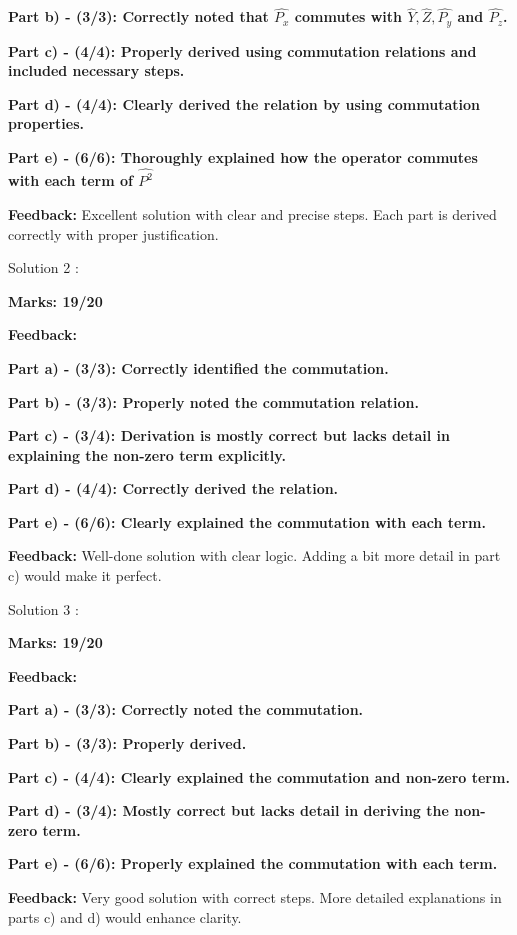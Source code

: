 \documentclass[a4paper,11pt]{article}
\begin{document}
\textbf{Part b) - (3/3): Correctly noted that $\hat{P_x}$ commutes with $\hat{Y},\hat{Z}, \hat{P_y}$ and $\hat{P_z}$.}

\textbf{Part c) - (4/4): Properly derived using commutation relations and included necessary steps.}

\textbf{Part d) - (4/4): Clearly derived the relation by using commutation properties.}

\textbf{Part e) - (6/6): Thoroughly explained how the operator commutes with each term of $\hat{P^2}$}


\textbf{Feedback:}
Excellent solution with clear and precise steps. Each part is derived correctly with proper justification.


Solution 2 :

\textbf{Marks: 19/20}

\textbf{Feedback:}

\textbf{Part a) - (3/3): Correctly identified the commutation.}

\textbf{Part b) -  (3/3): Properly noted the commutation relation.}

\textbf{Part c) - (3/4): Derivation is mostly correct but lacks detail in explaining the non-zero term explicitly.}

\textbf{Part d) - (4/4): Correctly derived the relation.}

\textbf{Part e) - (6/6): Clearly explained the commutation with each term.}


\textbf{Feedback:}
Well-done solution with clear logic. Adding a bit more detail in part c) would make it perfect.



Solution 3 :

\textbf{Marks: 19/20}

\textbf{Feedback:}

\textbf{Part a) - (3/3): Correctly noted the commutation.}

\textbf{Part b) - (3/3): Properly derived.}

\textbf{Part c) - (4/4): Clearly explained the commutation and non-zero term.}

\textbf{Part d) - (3/4): Mostly correct but lacks detail in deriving the non-zero term.}

\textbf{Part e) - (6/6): Properly explained the commutation with each term.}


\textbf{Feedback:}
Very good solution with correct steps. More detailed explanations in parts c) and d) would enhance clarity.
\end{document}
